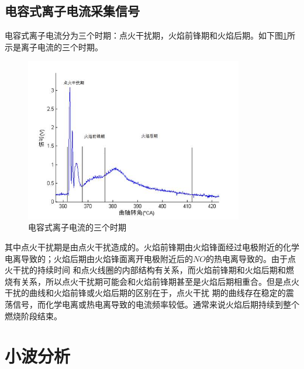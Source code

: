 \subsection{电容式离子电流采集信号}
电容式离子电流分为三个时期：点火干扰期，火焰前锋期和火焰后期。如下图\ref{fig:ion_basic}所示是离子电流的三个时期\cite{saitzkoff1997cylinder}。
\begin{figure}[!h]
	\centering
	\includegraphics[width = 0.85\textwidth]{thesis_figure/model_chapter/ion_basic}
	\caption{电容式离子电流的三个时期\cite{bh2007}}
	\label{fig:ion_basic}
\end{figure}
其中点火干扰期是由点火干扰造成的。火焰前锋期由火焰锋面经过电极附近的化学电离导致的；火焰后期由火焰锋面离开电极附近后的$NO$的热电离导致的。由于点火干扰的持续时间
和点火线圈的内部结构有关系，而火焰前锋期和火焰后期和燃烧有关系，所以点火干扰期可能会和火焰前锋期甚至是火焰后期相重合。但是点火干扰的曲线和火焰前锋或火焰后期的区别在于，点火干扰
期的曲线存在稳定的震荡信号，而化学电离或热电离导致的电流频率较低。通常来说火焰后期持续到整个燃烧阶段结束。
\section{小波分析}
